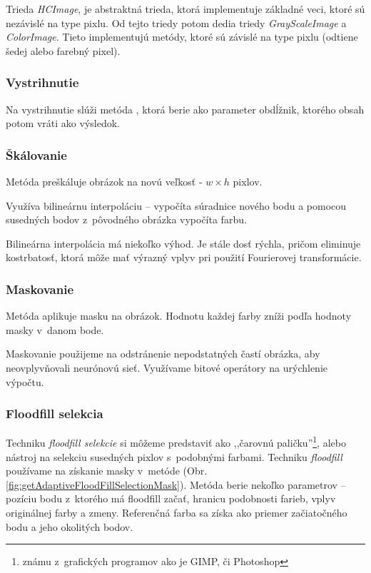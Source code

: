 Trieda \textit{HCImage}, je abstraktná trieda, ktorá implementuje základné veci, ktoré sú nezávislé na type pixlu. Od tejto triedy potom dedia triedy \textit{GrayScaleImage} a \textit{ColorImage}. Tieto implementujú metódy, ktoré sú závislé na type pixlu (odtiene šedej alebo farebný pixel). 

\subsubsection{Vystrihnutie}
Na vystrihnutie slúži metóda , ktorá berie ako parameter obdĺžnik, ktorého obsah potom vráti ako výsledok. 

\subsubsection{Škálovanie}
\label{chap:scale}
Metóda  preškáluje obrázok na novú veľkosť - $w\times h$ pixlov.

Využíva bilineárnu interpoláciu -- vypočíta súradnice nového bodu a pomocou susedných bodov z~pôvodného obrázka vypočíta farbu.

Bilineárna interpolácia má niekoľko výhod. Je stále dosť rýchla, pričom eliminuje kostrbatosť, ktorá môže mať výrazný vplyv pri použití Fourierovej transformácie.

\subsubsection{Maskovanie}

Metóda  aplikuje masku na obrázok. Hodnotu každej farby zníži podľa hodnoty masky v~danom bode.

Maskovanie použijeme na odstránenie nepodstatných častí obrázka, aby neovplyvňovali neurónovú sieť. Využívame bitové operátory na urýchlenie výpočtu. %

\subsubsection{Floodfill selekcia}
Techniku \textit{floodfill selekcie} si môžeme predstaviť ako ,,čarovnú paličku''\footnote{známu z~grafických programov ako je GIMP, či Photoshop}, alebo nástroj na selekciu susedných pixlov s~podobnými farbami. Techniku \textit{floodfill} používame na získanie masky v~metóde  (Obr. \ref{fig:getAdaptiveFloodFillSelectionMask}). Metóda berie nekoľko parametrov -- pozíciu bodu z~ktorého má floodfill začať, hranicu podobnosti farieb, vplyv originálnej farby a zmeny. Referenčná farba sa získa ako priemer začiatočného bodu a jeho okolitých bodov. 

